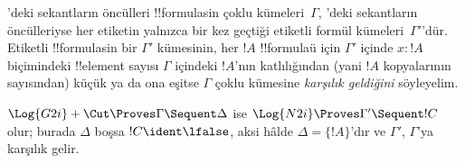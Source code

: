



'deki sekantların öncülleri !!{formula}s{}in çoklu kümeleri~$\Gamma$,
'deki sekantların öncülleriyse her etiketin yalnızca bir kez geçtiği
etiketli formül kümeleri~$\Gamma'$'dür. Etiketli !!{formula}s{}in bir
$\Gamma'$ kümesinin, her $!A$ !!{formula}{}ü için $\Gamma'$ içinde $x : !A$
biçimindeki !!{element} sayısı $\Gamma$ içindeki $!A$'nın katlılığından (yani
$!A$ kopyalarının sayısından) küçük ya da ona eşitse $\Gamma$ çoklu kümesine
\emph{karşılık geldiğini} söyleyelim.

\begin{prop}
$\Log{G2i} + \Cut \Proves \Gamma \Sequent \Delta$ ise $\Log{N2i}
\Proves \Gamma' \Sequent !C$ olur; burada $\Delta$ boşsa $!C \ident \lfalse$,
aksi hâlde $\Delta = \{!A\}$'dır ve $\Gamma'$, $\Gamma$'ya karşılık gelir.
\end{prop}

